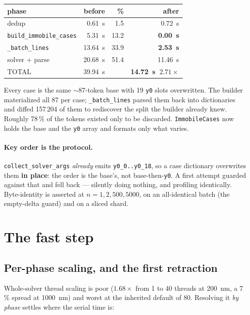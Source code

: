 \documentclass[11pt]{article}
\begin{document}
\begin{center}
\begin{tabular}{lrrr}
\toprule
phase & before & \% & after\\
\midrule
dedup & \SI{0.61}{\second} & 1.5 & \SI{0.72}{\second}\\
\texttt{build\_immobile\_cases} & \SI{5.31}{\second} & 13.2 & \textbf{\SI{0.00}{\second}}\\
\texttt{\_batch\_lines} & \SI{13.64}{\second} & 33.9 & \textbf{\SI{2.53}{\second}}\\
solver + parse & \SI{20.68}{\second} & 51.4 & \SI{11.46}{\second}\\
\midrule
\rowcolor{green!12}
TOTAL & \SI{39.94}{\second} & & \textbf{\SI{14.72}{\second}} $\;\mathbf{2.71\times}$\\
\bottomrule
\end{tabular}
\end{center}

Every case is the same $\sim$87-token base with 19 \texttt{y0} slots
overwritten. The builder materialized all 87 per case; \texttt{\_batch\_lines}
parsed them back into dictionaries and diffed 157\,204 of them to rediscover the
split the builder already knew. Roughly 78\,\% of the tokens existed only to be
discarded. \texttt{ImmobileCases} now holds the base and the \texttt{y0} array
and formats only what varies.

\paragraph{Key order is the protocol.} \texttt{collect\_solver\_args}
\emph{already} emits \texttt{y0\_0..y0\_18}, so a case dictionary overwrites
them \textbf{in place}: the order is the base's, not base-then-\texttt{y0}. A
first attempt guarded against that and fell back --- silently doing nothing, and
profiling identically. Byte-identity is asserted at $n = 1, 2, 500, 5000$, on an
all-identical batch (the empty-delta guard) and on a sliced shard.

\section{The fast step}

\subsection{Per-phase scaling, and the first retraction}
\label{sec:retract}
Whole-solver thread scaling is poor ($1.68\times$ from 1 to 40 threads at
\SI{200}{\nano\meter}, a 7\,\% spread at \SI{1000}{\nano\meter}) and worst at
the inherited default of 80. Resolving it \emph{by phase} settles where the
serial time is:
\end{document}
